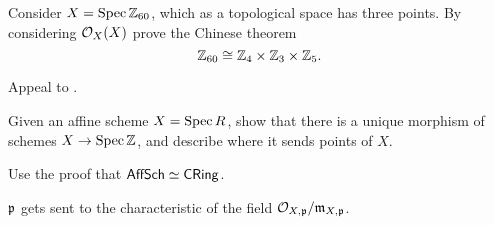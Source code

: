 \begin{dproblem}
	Consider $X = \operatorname{Spec} \mathbb Z_{60}$, which as a topological space has three points.
	By considering $\mathcal O_X(X)$ prove the Chinese theorem
	\[ \mathbb Z_{60} \cong \mathbb Z_{4} \times \mathbb Z_{3} \times \mathbb Z_{5}. \]
	\begin{hint}
		Appeal to .
	\end{hint}
\end{dproblem}

\begin{problem}
	Given an affine scheme $X = \operatorname{Spec} R$,
	show that there is a unique morphism of schemes $X \to \operatorname{Spec} \mathbb Z$,
	and describe where it sends points of $X$.
	\begin{hint}
		Use the proof that $\mathsf{AffSch} \simeq \mathsf{CRing}$.
	\end{hint}
	\begin{sol}
		$\mathfrak p$ gets sent to the characteristic of the field $\mathcal O_{X,\mathfrak p} / \mathfrak m_{X,\mathfrak p}$.
	\end{sol}
\end{problem}

